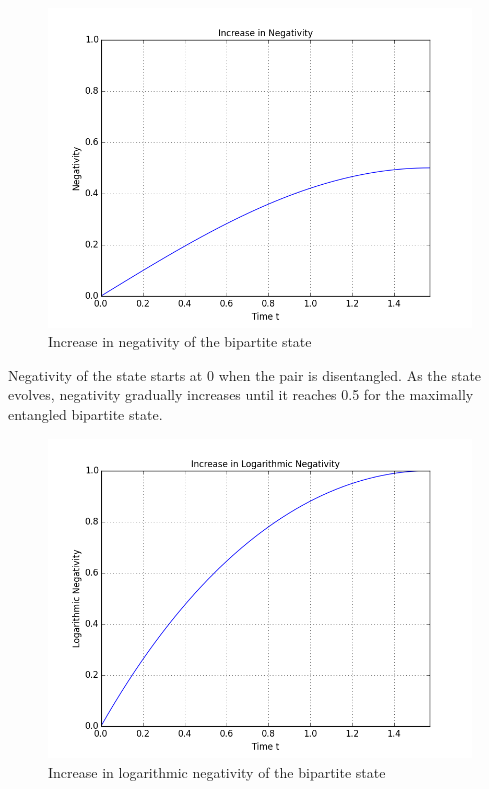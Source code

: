 \begin{center}
\begin{figure}[H]
  \begin{center}
    \includegraphics[scale=0.62]{figures/timeevolution-04.png}
    \caption{Increase in negativity of the bipartite state}
    \label{fig: Time Evolution: Negativity}
  \end{center}
\end{figure}
\end{center}

Negativity of the state starts at 0 when the pair is disentangled. As the state evolves, negativity gradually increases until it reaches 0.5 for the maximally entangled bipartite state.

\begin{center}
\begin{figure}[H]
  \begin{center}
    \includegraphics[scale=0.62]{figures/timeevolution-05.png}
    \caption{Increase in logarithmic negativity of the bipartite state}
    \label{fig: Time Evolution: Logaritmic Negativity}
  \end{center}
\end{figure}
\end{center}


